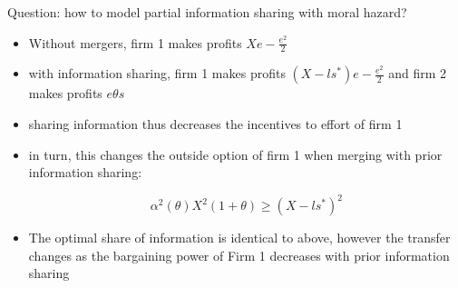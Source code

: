 \documentclass[a4paper]{article}
\renewcommand{\t}{\theta}
\renewcommand{\a}{\alpha}
\begin{document}
Question: how to model partial information sharing with moral hazard?

\begin{itemize}
    \item Without mergers, firm 1 makes profits $Xe-\frac{e^2}{2}$ 
    \item with information sharing, firm 1 makes profits $(X-ls^*)e-\frac{e^2}{2}$ and firm 2 makes profits $e\t s$
    \item sharing information thus decreases the incentives to effort of firm 1
    \item in turn, this changes the outside option of firm 1 when merging with prior information sharing:
    
    $$\a^2(\t) X^2(1+\t)\geq (X-ls^*)^2$$
    \item The optimal share of information is identical to above, however the transfer changes as the bargaining power of Firm 1 decreases with prior information sharing
\end{itemize}




\end{document}
